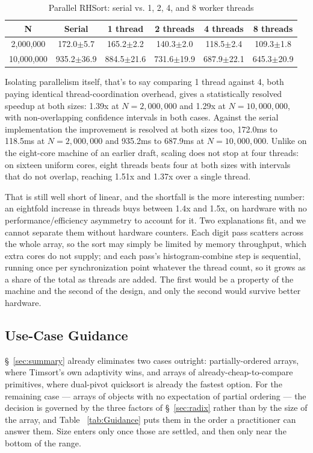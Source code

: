 \documentclass[twoside,leqno,twocolumn]{article}
\begin{document}
\begin{table}
  \caption{Parallel RHSort:
serial vs. 1, 2, 4, and 8 worker threads}
  \label{tab:ParallelRadix}
  \begin{tabular}{cccccc}
    \toprule
    N & Serial & 1 thread & 2 threads & 4 threads & 8 threads \\
    \midrule
    2,000,000 & 172.0$\pm$5.7 & 165.2$\pm$2.2 & 140.3$\pm$2.0 & 118.5$\pm$2.4 & 109.3$\pm$1.8 \\
    10,000,000 & 935.2$\pm$36.9 & 884.5$\pm$21.6 & 731.6$\pm$19.9 & 687.9$\pm$22.1 & 645.3$\pm$20.9 \\
    \bottomrule
  \end{tabular}
\end{table}

Isolating parallelism itself, that's to say comparing 1 thread against 4, both paying identical thread-coordination overhead,
gives a statistically resolved speedup at both sizes: 1.39x at $N=2{,}000{,}000$ and 1.29x at $N=10{,}000{,}000$,
with non-overlapping confidence intervals in both cases.
Against the serial implementation the improvement is resolved at both sizes too,
172.0ms to 118.5ms at $N=2{,}000{,}000$ and 935.2ms to 687.9ms at $N=10{,}000{,}000$.
Unlike on the eight-core machine of an earlier draft, scaling does not stop at four threads:
on sixteen uniform cores, eight threads beats four at both sizes with intervals that do not overlap,
reaching 1.51x and 1.37x over a single thread.

That is still well short of linear, and the shortfall is the more interesting number:
an eightfold increase in threads buys between 1.4x and 1.5x,
on hardware with no performance/efficiency asymmetry to account for it.
Two explanations fit, and we cannot separate them without hardware counters.
Each digit pass scatters across the whole array, so the sort may simply be limited by memory throughput,
which extra cores do not supply; and each pass's histogram-combine step is sequential,
running once per synchronization point whatever the thread count,
so it grows as a share of the total as threads are added.
The first would be a property of the machine and the second of the design,
and only the second would survive better hardware.

\subsection{Use-Case Guidance}
\label{sec:usecase}

\S~\ref{sec:summary} already eliminates two cases outright:
partially-ordered arrays, where Timsort's own adaptivity wins, and arrays of already-cheap-to-compare primitives,
where dual-pivot quicksort is already the fastest option.
For the remaining case — arrays of objects with no expectation of partial ordering —
the decision is governed by the three factors of \S~\ref{sec:radix}
rather than by the size of the array,
and Table ~\ref{tab:Guidance} puts them in the order a practitioner can answer them.
Size enters only once those are settled, and then only near the bottom of the range.
\end{document}
